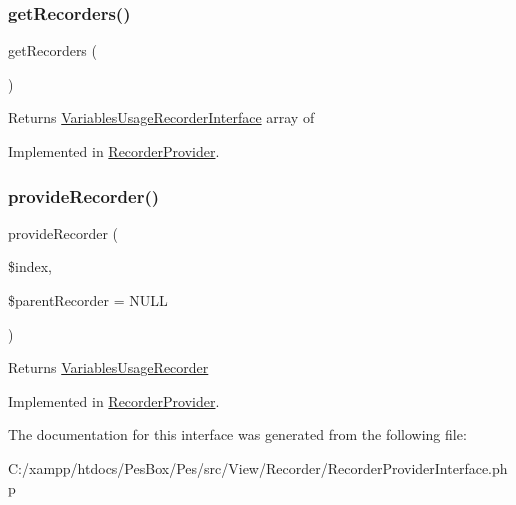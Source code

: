 \subsubsection{\texorpdfstring{get\+Recorders()}{getRecorders()}}
{\footnotesize\ttfamily get\+Recorders (\begin{DoxyParamCaption}{ }\end{DoxyParamCaption})}

\begin{DoxyReturn}{Returns}
\mbox{\hyperlink{interface_pes_1_1_view_1_1_recorder_1_1_variables_usage_recorder_interface}{Variables\+Usage\+Recorder\+Interface}} array of 
\end{DoxyReturn}


Implemented in \mbox{\hyperlink{class_pes_1_1_view_1_1_recorder_1_1_recorder_provider_ad8b2b29a9520c160fd7b09907bd01e27}{Recorder\+Provider}}.

\mbox{\label{interface_pes_1_1_view_1_1_recorder_1_1_recorder_provider_interface_a3a845b7c3190054b0443ad6d53022756}} 
\subsubsection{\texorpdfstring{provide\+Recorder()}{provideRecorder()}}
{\footnotesize\ttfamily provide\+Recorder (\begin{DoxyParamCaption}\item[{}]{\$index,  }\item[{\mbox{\hyperlink{interface_pes_1_1_view_1_1_recorder_1_1_variables_usage_recorder_interface}{Variables\+Usage\+Recorder\+Interface}}}]{\$parent\+Recorder = {\ttfamily NULL} }\end{DoxyParamCaption})}

\begin{DoxyReturn}{Returns}
\mbox{\hyperlink{class_pes_1_1_view_1_1_recorder_1_1_variables_usage_recorder}{Variables\+Usage\+Recorder}} 
\end{DoxyReturn}


Implemented in \mbox{\hyperlink{class_pes_1_1_view_1_1_recorder_1_1_recorder_provider_a3a845b7c3190054b0443ad6d53022756}{Recorder\+Provider}}.



The documentation for this interface was generated from the following file\+:\begin{DoxyCompactItemize}
\item 
C\+:/xampp/htdocs/\+Pes\+Box/\+Pes/src/\+View/\+Recorder/Recorder\+Provider\+Interface.\+php\end{DoxyCompactItemize}
